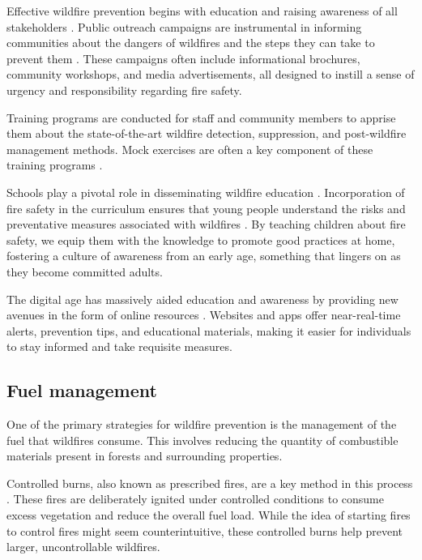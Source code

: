\documentclass[
  12 pt,
]{Nemilov}
\begin{document}
Effective wildfire prevention begins with education and raising awareness of all stakeholders \citep{hesseln2018wildland}. Public outreach campaigns are instrumental in informing communities about the dangers of wildfires and the steps they can take to prevent them \citep{brenkert2013social, crow2015information}. These campaigns often include informational brochures, community workshops, and media advertisements, all designed to instill a sense of urgency and responsibility regarding fire safety.

Training programs are conducted for staff and community members to apprise them about the state-of-the-art wildfire detection, suppression, and post-wildfire management methods. Mock exercises are often a key component of these training programs \citep{stephens2023building}.

Schools play a pivotal role in disseminating wildfire education \citep{marquette2023integrating}. Incorporation of fire safety in the curriculum ensures that young people understand the risks and preventative measures associated with wildfires \citep{restaino2024taking}. By teaching children about fire safety, we equip them with the knowledge to promote good practices at home, fostering a culture of awareness from an early age, something that lingers on as they become committed adults.

The digital age has massively aided education and awareness by providing new avenues in the form of online resources \citep{chauhan2017providing}. Websites and apps offer near-real-time alerts, prevention tips, and educational materials, making it easier for individuals to stay informed and take requisite measures.

\subsection{Fuel management}\label{fuel-management}

One of the primary strategies for wildfire prevention is the management of the fuel that wildfires consume. This involves reducing the quantity of combustible materials present in forests and surrounding properties.

Controlled burns, also known as prescribed fires, are a key method in this process \citep{wagle1979controlled}. These fires are deliberately ignited under controlled conditions to consume excess vegetation and reduce the overall fuel load. While the idea of starting fires to control fires might seem counterintuitive, these controlled burns help prevent larger, uncontrollable wildfires.
\end{document}
